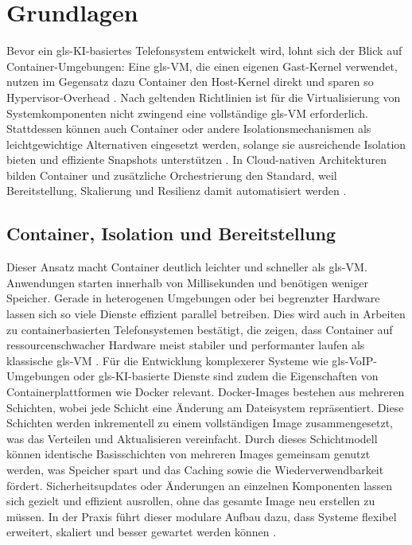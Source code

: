 \chapter{Grundlagen}
\label{chap:grundlagen}

Bevor ein \gls{gls-KI}-basiertes Telefonsystem entwickelt wird, lohnt sich der Blick auf Container-Umgebungen: Eine \gls{gls-VM}, die einen eigenen Gast-Kernel verwendet, nutzen im Gegensatz dazu Container den Host-Kernel direkt und sparen so Hypervisor-Overhead \parencite{Antonova2025}. Nach geltenden Richtlinien ist für die Virtualisierung von Systemkomponenten nicht zwingend eine vollständige \gls{gls-VM} erforderlich. Stattdessen können auch Container oder andere Isolationsmechanismen als leichtgewichtige Alternativen eingesetzt werden, solange sie ausreichende Isolation bieten und effiziente Snapshots unterstützen \parencite{ETSI-REL}. In Cloud-nativen Architekturen bilden Container und zusätzliche Orchestrierung den Standard, weil Bereitstellung, Skalierung und Resilienz damit automatisiert werden \parencite{ReliabilityVirtualizedNetworks}.

\section[Container, Isolation und
Deployment]{Container, Isolation und
Bereitstellung}

Dieser Ansatz macht Container deutlich leichter und schneller als \gls{gls-VM}. Anwendungen starten innerhalb von Millisekunden und
benötigen weniger Speicher. Gerade in heterogenen Umgebungen oder bei begrenzter Hardware lassen sich so viele Dienste effizient parallel betreiben. Dies wird auch in Arbeiten zu containerbasierten Telefonsystemen bestätigt, die zeigen, dass Container auf ressourcenschwacher Hardware meist stabiler und performanter laufen als klassische \gls{gls-VM} \parencite{Antonova2025}.
Für die Entwicklung komplexerer Systeme wie \gls{gls-VoIP}-Umgebungen oder \gls{gls-KI}-basierte Dienste sind zudem die Eigenschaften von Containerplattformen wie Docker relevant. Docker-Images bestehen aus mehreren Schichten, wobei jede Schicht eine Änderung am Dateisystem repräsentiert. Diese Schichten werden inkrementell zu einem vollständigen Image zusammengesetzt, was das Verteilen und Aktualisieren vereinfacht. Durch dieses Schichtmodell können identische Basisschichten von mehreren Images gemeinsam genutzt werden, was Speicher spart und das Caching sowie die Wiederverwendbarkeit fördert. Sicherheitsupdates oder Änderungen an einzelnen Komponenten lassen sich gezielt und effizient ausrollen, ohne das gesamte Image neu erstellen zu müssen. In der Praxis führt dieser modulare Aufbau dazu, dass Systeme flexibel erweitert, skaliert und besser gewartet werden können \parencite{docker-docs}.


